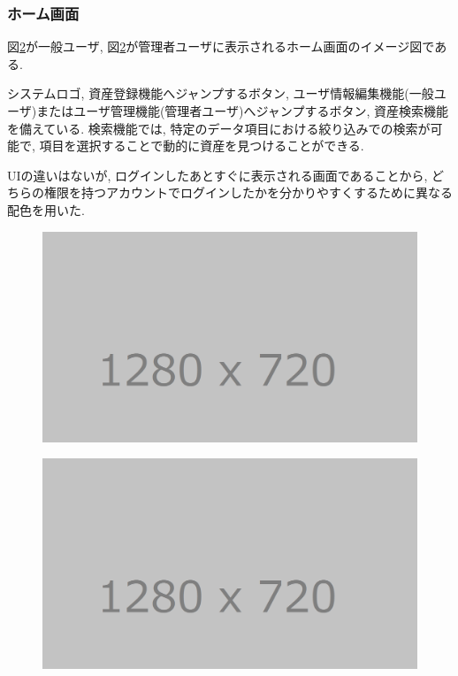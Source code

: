 \documentclass[11ptm]{jsarticle}
\begin{document}
\subsubsection{ホーム画面}
\label{sec:ホーム画面}
図\ref{fig:}が一般ユーザ, 図\ref{fig:}が管理者ユーザに表示されるホーム画面のイメージ図である. \par
システムロゴ, 資産登録機能へジャンプするボタン, ユーザ情報編集機能(一般ユーザ)またはユーザ管理機能(管理者ユーザ)へジャンプするボタン, 資産検索機能を備えている. 検索機能では, 特定のデータ項目における絞り込みでの検索が可能で, 項目を選択することで動的に資産を見つけることができる. \par
UIの違いはないが, ログインしたあとすぐに表示される画面であることから, どちらの権限を持つアカウントでログインしたかを分かりやすくするために異なる配色を用いた.
\begin{figure}[h]
  \centering
  \includegraphics[keepaspectratio, width=0.8\linewidth]{source/tmp_picture.png}
  \caption{\label{fig:}}
\end{figure}
\begin{figure}[h]
  \centering
  \includegraphics[keepaspectratio, width=0.8\linewidth]{source/tmp_picture.png}
  \caption{\label{fig:}}
\end{figure}

\clearpage
\end{document}
